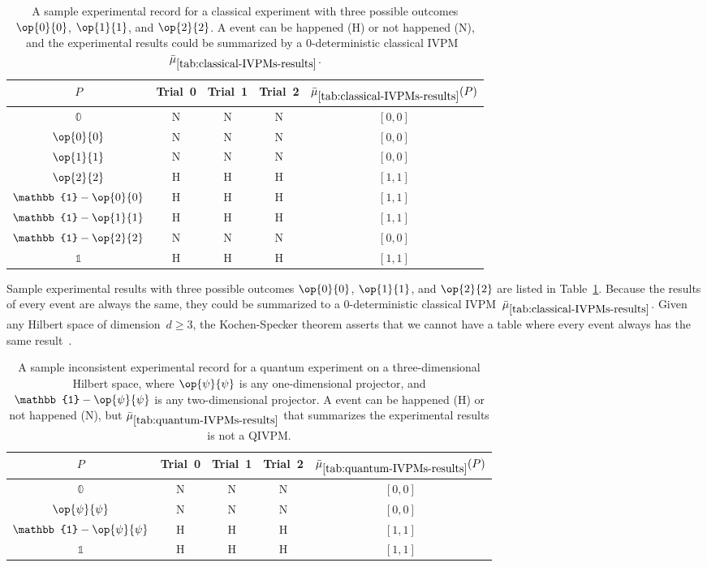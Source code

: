 \documentclass[english,reprint, aps, prl,superscriptaddress, showpacs,
showkeys, longbibliography, amsmath, amssymb, floatfix]{revtex4-1}
\theoremstyle{plain}
\theoremstyle{definition}
\newcommand{\imposs}{\ensuremath{\left[0,0\right]}}
\newcommand{\necess}{\ensuremath{\left[1,1\right]}}
\newcommand{\proj}[1]{\op{#1}{#1}}
\newcommand{\happen}{\text{H}}
\newcommand{\notHappen}{\text{N}}
\begin{document}
\begin{table}
\noindent \centering{}\caption{\label{tab:classical-IVPMs-results}A sample experimental record for
a classical experiment with three possible outcomes $\proj{0}$, $\proj{1}$,
and $\proj{2}$. A event can be happened ($\happen$) or not happened
($\notHappen$), and the experimental results could be summarized
by a $0$-deterministic classical IVPM~$\bar{\mu}_{\ref{tab:classical-IVPMs-results}}$.}
\begin{tabular}{ccccc}
\toprule 
\addlinespace
$P$  & Trial~0 & Trial~1 & Trial~2 & $\bar{\mu}_{\ref{tab:classical-IVPMs-results}}(P)$\tabularnewline
\midrule
\midrule 
\addlinespace
$\mathbb{0}$  & $\notHappen$ & $\notHappen$ & $\notHappen$ & $\imposs$\tabularnewline
\midrule 
\addlinespace
$\proj{0}$  & $\notHappen$ & $\notHappen$ & $\notHappen$ & $\imposs$\tabularnewline
\midrule 
\addlinespace
$\proj{1}$  & $\notHappen$ & $\notHappen$ & $\notHappen$ & $\imposs$\tabularnewline
\midrule 
\addlinespace
$\proj{2}$ & $\happen$ & $\happen$ & $\happen$ & $\necess$\tabularnewline
\midrule 
\addlinespace
$\mathbb{1}-\proj{0}$  & $\happen$ & $\happen$ & $\happen$ & $\necess$\tabularnewline
\midrule 
\addlinespace
$\mathbb{1}-\proj{1}$  & $\happen$ & $\happen$ & $\happen$ & $\necess$\tabularnewline
\midrule 
\addlinespace
$\mathbb{1}-\proj{2}$ & $\notHappen$ & $\notHappen$ & $\notHappen$ & $\imposs$\tabularnewline
\midrule 
\addlinespace
$\mathbb{1}$  & $\happen$ & $\happen$ & $\happen$ & $\necess$\tabularnewline
\bottomrule
\end{tabular}
\end{table}
Sample experimental results with three possible outcomes $\proj{0}$,
$\proj{1}$, and $\proj{2}$ are listed in Table~\ref{tab:classical-IVPMs-results}.
Because the results of every event are always the same, they could
be summarized to a $0$-deterministic classical IVPM~$\bar{\mu}_{\ref{tab:classical-IVPMs-results}}$.
Given any Hilbert space of dimension~$d\ge3$, the Kochen-Specker
theorem asserts that we cannot have a table where every event always
has the same result~\cite{THOS2017}. 
\begin{table}
\noindent \centering{}\caption{\label{tab:quantum-IVPMs-results}A sample inconsistent experimental
record for a quantum experiment on a three-dimensional Hilbert space,
where $\proj{\psi}$ is any one-dimensional projector, and $\mathbb{1}-\proj{\psi}$
is any two-dimensional projector. A event can be happened ($\happen$)
or not happened ($\notHappen$), but $\bar{\mu}_{\ref{tab:quantum-IVPMs-results}}$
that summarizes the experimental results is not a QIVPM.}
\begin{tabular}{ccccc}
\toprule 
\addlinespace
$P$  & Trial~0 & Trial~1 & Trial~2 & $\bar{\mu}_{\ref{tab:quantum-IVPMs-results}}(P)$\tabularnewline
\midrule
\midrule 
\addlinespace
$\mathbb{0}$  & $\notHappen$ & $\notHappen$ & $\notHappen$ & $\imposs$\tabularnewline
\midrule 
\addlinespace
$\proj{\psi}$  & $\notHappen$ & $\notHappen$ & $\notHappen$ & $\imposs$\tabularnewline
\midrule 
\addlinespace
$\mathbb{1}-\proj{\psi}$  & $\happen$ & $\happen$ & $\happen$ & $\necess$\tabularnewline
\midrule 
\addlinespace
$\mathbb{1}$  & $\happen$ & $\happen$ & $\happen$ & $\necess$\tabularnewline
\bottomrule
\end{tabular}
\end{table}
\end{document}
